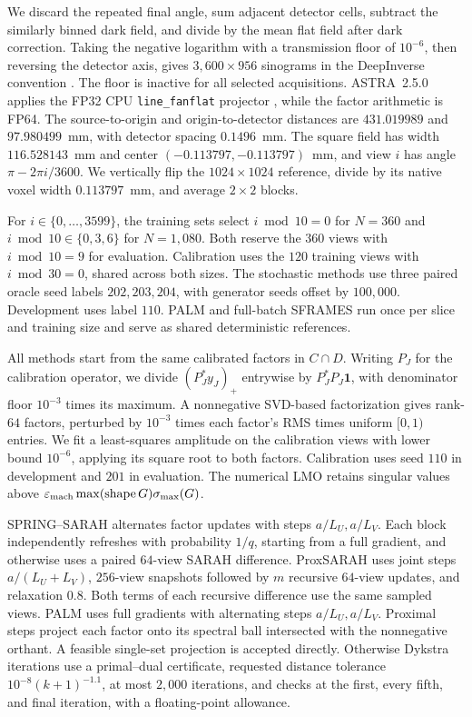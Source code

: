 We discard the repeated final angle, sum adjacent detector cells, subtract
the similarly binned dark field, and divide by the mean flat field after
dark correction. Taking the negative logarithm with a transmission floor
of \(10^{-6}\), then reversing the detector axis, gives
\(3{,}600\times956\) sinograms in the DeepInverse convention
\cite{deepinv}. The floor is inactive for all selected acquisitions.
ASTRA~2.5.0 applies the FP32 CPU \texttt{line\_fanflat} projector
\cite{astra}, while the factor arithmetic is FP64. The source-to-origin
and origin-to-detector distances are \(431.019989\) and \(97.980499\)~mm,
with detector spacing \(0.1496\)~mm. The square field has width
\(116.528143\)~mm and center \((-0.113797,-0.113797)\)~mm, and view
\(i\) has angle \(\pi-2\pi i/3600\). We vertically flip the
\(1024\times1024\) reference, divide by its native voxel width
\(0.113797\)~mm, and average \(2\times2\) blocks.

For \(i\in\{0,\ldots,3599\}\), the training sets select
\(i\bmod10=0\) for \(N=360\) and
\(i\bmod10\in\{0,3,6\}\) for \(N=1{,}080\). Both reserve the
\(360\) views with \(i\bmod10=9\) for evaluation. Calibration uses the
\(120\) training views with \(i\bmod30=0\), shared across both sizes.
The stochastic methods use three paired oracle seed labels
\(202,203,204\), with generator seeds offset by \(100{,}000\).
Development uses label \(110\). PALM and full-batch SFRAMES run once
per slice and training size and serve as shared deterministic references.

All methods start from the same calibrated factors in \(C\cap D\).
Writing \(P_J\) for the calibration operator, we divide
\((P_J^\ast y_J)_+\) entrywise by \(P_J^\ast P_J\mathbf1\), with
denominator floor \(10^{-3}\) times its maximum. A nonnegative
SVD-based factorization gives rank-\(64\) factors, perturbed by
\(10^{-3}\) times each factor's RMS times uniform \([0,1)\) entries.
We fit a least-squares amplitude on the calibration views with lower bound
\(10^{-6}\), applying its square root to both factors. Calibration uses
seed \(110\) in development and \(201\) in evaluation. The numerical LMO retains singular values above
\(\varepsilon_{\rm mach}\max(\operatorname{shape}G)\sigma_{\max}(G)\).

SPRING--SARAH \cite{spring} alternates factor updates with steps
\(a/L_U,a/L_V\). Each block independently refreshes with probability
\(1/q\), starting from a full gradient, and otherwise uses a paired
\(64\)-view SARAH difference. ProxSARAH \cite{proxsarah} uses joint steps
\(a/(L_U+L_V)\), \(256\)-view snapshots followed by \(m\) recursive
\(64\)-view updates, and relaxation \(0.8\). Both terms of each recursive
difference use the same sampled views. PALM \cite{palm} uses full gradients
with alternating steps \(a/L_U,a/L_V\). Proximal steps project each factor
onto its spectral ball intersected with the nonnegative orthant. A feasible
single-set projection is accepted directly. Otherwise Dykstra iterations
use a primal--dual certificate, requested distance tolerance
\(10^{-8}(k+1)^{-1.1}\), at most \(2{,}000\) iterations, and checks at the
first, every fifth, and final iteration, with a floating-point allowance.

